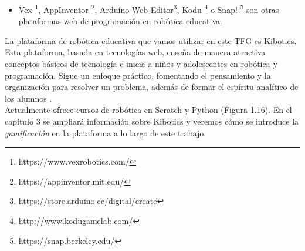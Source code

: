 \begin{itemize}
    \item Vex \footnote{https://www.vexrobotics.com/}, AppInventor \footnote{https://appinventor.mit.edu/}, Arduino Web Editor\footnote{https://store.arduino.cc/digital/create}, Kodu \footnote{http://www.kodugamelab.com/} o Snap! \footnote{https://snap.berkeley.edu/} son otras plataformas web de programación en robótica educativa.
\end{itemize}


La plataforma de robótica educativa que vamos utilizar en este TFG es Kibotics. Esta plataforma, basada en tecnologías web, enseña de manera atractiva conceptos básicos de tecnología e inicia a niños y adolescentes en robótica y programación. Sigue un enfoque práctico, fomentando el pensamiento y la organización para resolver un problema, además de formar el espíritu analítico de los alumnos \cite{intro}.
\\
Actualmente ofrece cursos de robótica en Scratch y Python (Figura 1.16). En el capítulo 3 se ampliará información sobre Kibotics y veremos cómo se introduce la \textit{gamificación} en la plataforma a lo largo de este trabajo.


